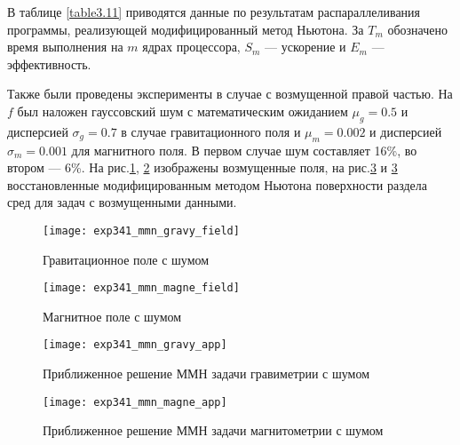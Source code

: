 В таблице \ref{table3.11} приводятся данные по результатам распараллеливания программы, реализующей модифицированный метод Ньютона. За $T_m$ обозначено время выполнения на $m$ ядрах процессора, $S_m$ --- ускорение и $E_m$ --- эффективность.

Также были проведены эксперименты в случае с возмущенной правой частью. На $f$ был наложен гауссовский шум с математическим ожиданием $\mu_g=0.5$ и дисперсией $\sigma_g=0.7$ в случае гравитационного поля и $\mu_m=0.002$ и дисперсией $\sigma_m=0.001$ для магнитного поля. В первом случае шум составляет 16\%, во втором --- 6\%. На рис.\ref{fig:exp341_mmn_gravy_field}, \ref{fig:exp341_mmn_magne_field} изображены возмущенные поля, на рис.\ref{fig:exp341_mmn_gravy_app} и \ref{fig:exp341_mmn_gravy_app} восстановленные модифицированным методом Ньютона поверхности раздела сред для задач с возмущенными данными.
\begin{figure}[H]
	\centering
	\texttt{[image: exp341\_mmn\_gravy\_field]}
	\caption{Гравитационное поле с шумом}
	\label{fig:exp341_mmn_gravy_field}
\end{figure}
\begin{figure}[H]
	\centering
	\texttt{[image: exp341\_mmn\_magne\_field]}
	\caption{Магнитное поле с шумом}
	\label{fig:exp341_mmn_magne_field}
\end{figure}
\begin{figure}[H]
	\centering
	\texttt{[image: exp341\_mmn\_gravy\_app]}
	\caption{Приближенное решение ММН задачи гравиметрии с шумом}
	\label{fig:exp341_mmn_gravy_app}
\end{figure}
\begin{figure}[H]
	\centering
	\texttt{[image: exp341\_mmn\_magne\_app]}
	\caption{Приближенное решение ММН задачи магнитометрии с шумом}
	\label{fig:exp341_mmn_magne_app}
\end{figure}


